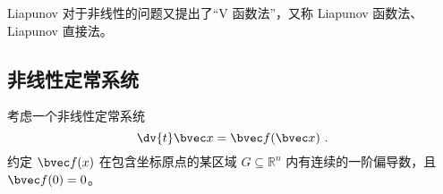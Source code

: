 
Liapunov 对于非线性的问题又提出了“V 函数法”，又称 Liapunov 函数法、Liapunov 直接法。

\subsection{非线性定常系统}
考虑一个非线性定常系统 
\begin{equation}
\dv{t} \bvec x = \bvec f(\bvec x) ~.
\end{equation}
约定 $\bvec f(x)$ 在包含坐标原点的某区域 $G \subseteq \mathbb R^n$ 内有连续的一阶偏导数，且 $\bvec f(0) = 0$。